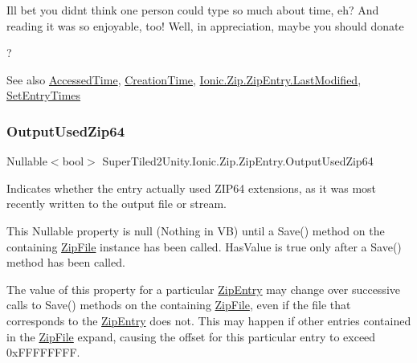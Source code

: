 I\textquotesingle{}ll bet you didn\textquotesingle{}t think one person could type so much about time, eh? And reading it was so enjoyable, too! Well, in appreciation, maybe you should donate

? 

\begin{DoxySeeAlso}{See also}
\mbox{\hyperlink{class_super_tiled2_unity_1_1_ionic_1_1_zip_1_1_zip_entry_abc1a038c251f1ed0e2c1435a5bab23fd}{Accessed\+Time}}, \mbox{\hyperlink{class_super_tiled2_unity_1_1_ionic_1_1_zip_1_1_zip_entry_a38ef2ae810c3b89b1f23ebea918fb60e}{Creation\+Time}}, \mbox{\hyperlink{class_super_tiled2_unity_1_1_ionic_1_1_zip_1_1_zip_entry_acd1234fd27c216b59c166c2b96aba3dd}{Ionic.\+Zip.\+Zip\+Entry.\+Last\+Modified}}, \mbox{\hyperlink{class_super_tiled2_unity_1_1_ionic_1_1_zip_1_1_zip_entry_a7331ca69b05c476a9d321b30d7649766}{Set\+Entry\+Times}}


\end{DoxySeeAlso}
\mbox{\label{class_super_tiled2_unity_1_1_ionic_1_1_zip_1_1_zip_entry_a1e1ef842a3e02644daeffa985f14ac11}} 
\subsubsection{\texorpdfstring{Output\+Used\+Zip64}{OutputUsedZip64}}
{\footnotesize\ttfamily Nullable$<$bool$>$ Super\+Tiled2\+Unity.\+Ionic.\+Zip.\+Zip\+Entry.\+Output\+Used\+Zip64\hspace{0.3cm}{\ttfamily [get]}}



Indicates whether the entry actually used Z\+I\+P64 extensions, as it was most recently written to the output file or stream. 

This Nullable property is null (Nothing in VB) until a {\ttfamily Save()} method on the containing \mbox{\hyperlink{class_super_tiled2_unity_1_1_ionic_1_1_zip_1_1_zip_file}{Zip\+File}} instance has been called. {\ttfamily Has\+Value} is true only after a {\ttfamily Save()} method has been called. 

The value of this property for a particular {\ttfamily \mbox{\hyperlink{class_super_tiled2_unity_1_1_ionic_1_1_zip_1_1_zip_entry}{Zip\+Entry}}} may change over successive calls to {\ttfamily Save()} methods on the containing \mbox{\hyperlink{class_super_tiled2_unity_1_1_ionic_1_1_zip_1_1_zip_file}{Zip\+File}}, even if the file that corresponds to the {\ttfamily \mbox{\hyperlink{class_super_tiled2_unity_1_1_ionic_1_1_zip_1_1_zip_entry}{Zip\+Entry}}} does not. This may happen if other entries contained in the {\ttfamily \mbox{\hyperlink{class_super_tiled2_unity_1_1_ionic_1_1_zip_1_1_zip_file}{Zip\+File}}} expand, causing the offset for this particular entry to exceed 0x\+F\+F\+F\+F\+F\+F\+FF. 

